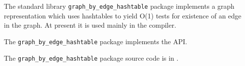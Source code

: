 
The standard library {\tt graph\_by\_edge\_hashtable} package implements a graph representation which uses hashtables to yield O(1) tests for existence of an edge in the graph.
At present it is used mainly in the compiler.

The {\tt graph\_by\_edge\_hashtable} package implements the  API.

The {\tt graph\_by\_edge\_hashtable} package source code is in .




